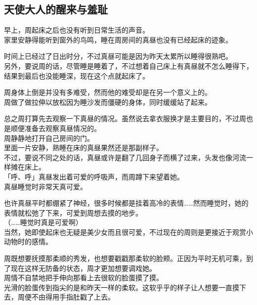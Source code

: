 \subsection{天使大人的醒来与羞耻}

早上，周起床之后也没有听到日常生活的声音。\\

家里安静得能听到窗外的鸟鸣，睡在周房间的真昼也没有已经起床的迹象。

时间上已经过了日出时分，不过真昼可能是因为昨天太累所以睡得很熟吧。\\

另外，要说周的话，尽管睡是睡着了，不过想着自己床上有真昼就不怎么睡得下，结果到最后也没能睡深，现在这个点就起床了。

周身体上倒是并没有多难受，然而他的难受却是在另一个意义上的。\\

周做了做拉伸以放松因为睡沙发而僵硬的身体，同时缓缓站了起来。

总之周打算先去观察一下真昼的情况。虽然说去拿衣服换才是主要目的，不过周也是顺便准备去观察真昼情况的。\\

周静静地打开自己房间的门。\\

里面一片安静，熟睡在床的真昼果然还是那副样子。\\

不过，要说不同之处的话，真昼或许是翻了几回身子而横了过来，头发也像河流一样摊在床上。\\

「呼、呼」真昼发出着可爱的呼吸声，而周蹲下来望着她。\\

真昼睡觉时非常天真可爱。

也许真昼平时都绷紧了神经，很多时候都是挂着高冷的表情……然而睡觉时，她的表情就松弛了下来，可爱到周想去摸的地步。\\

（……睡觉时真是可爱啊）\\

当然，她即使起床也无疑是美少女而且很可爱，不过现在的周则是更接近于观赏小动物时的感情。

周既想要抚摸那柔顺的秀发，也想要戳戳那柔软的脸颊。正因为平时无机可乘，到了现在这样无防备的状态，周才更加想要调戏她。\\

周情不自禁地把手伸向那看上去很软的脸蛋摸了摸。\\

光滑的脸蛋传到指尖的是和昨天一样的柔软。这软乎乎的样子让人想要一直摸下去，周便不由得用手指肚戳了上去。\\

